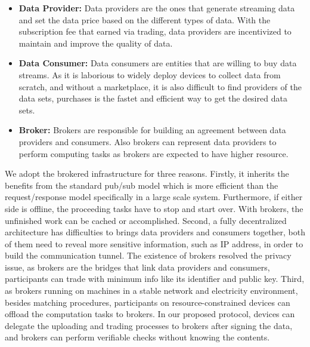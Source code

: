 \documentclass[conference]{IEEEtran}
\begin{document}
\begin{itemize}
\item \textbf{Data Provider: }
Data providers are the ones that generate streaming data and set the data price based on the different types of data. With the subscription fee that earned via trading, data providers are incentivized to maintain and improve the quality of data.
\item \textbf{Data Consumer: }
Data consumers are entities that are willing to buy data streams. As it is laborious to widely deploy devices to collect data from scratch, and without a marketplace, it is also difficult to find providers of the data sets, purchases is the fastet and efficient way to get the desired data sets. 
\item \textbf{Broker: }
Brokers are responsible for building an agreement between data providers and consumers. Also brokers can represent data providers to perform computing tasks as brokers are expected to have higher resource. 
\end{itemize}

We adopt the brokered infrastructure for three reasons. Firstly, it inherits the benefits from the standard pub/sub model which is more efficient than the request/response model specifically in a large scale system. Furthermore, if either side is offline, the proceeding tasks have to stop and start over. With brokers, the unfinished work can be cached or accomplished. Second, a fully decentralized architecture has difficulties to brings data providers and consumers together, both of them need to reveal more sensitive information, such as IP address, in order to build the communication tunnel. The existence of brokers resolved the privacy issue, as brokers are the bridges that link data providers and consumers, participants can trade with minimum info like its identifier and public key. Third, as brokers running on machines in a stable network and electricity environment, besides matching procedures, participants on resource-constrained devices can offload the computation tasks to brokers. In our proposed protocol, devices can delegate the uploading and trading processes to brokers after signing the data, and brokers can perform verifiable checks without knowing the contents.           

\end{document}
